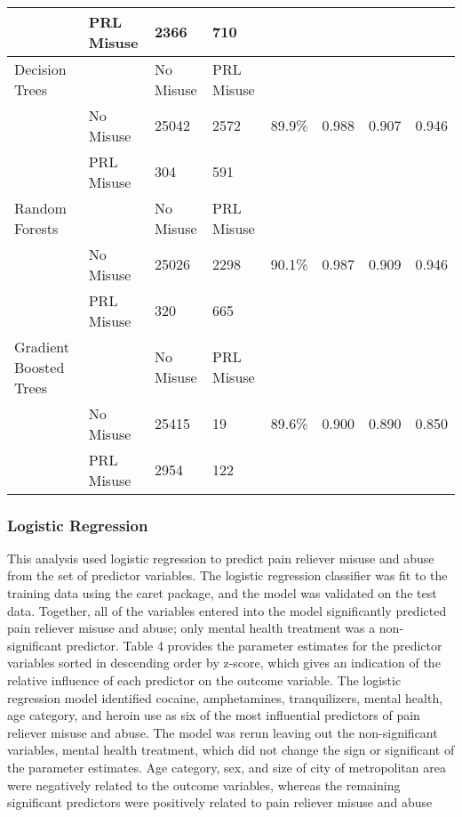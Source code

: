 \\\documentclass[sigconf]{acmart}
\begin{document}
\begin{table*}[ht]
\begin{tabular}{llllllll}
     & PRL Misuse & 2366 & 710 &  &  &  & \\
    \midrule
    Decision Trees & & No Misuse & PRL Misuse &  &  &  & \\
     & No Misuse & 25042 & 2572 & 89.9\% & 0.988 & 0.907 & 0.946 \\
     & PRL Misuse & 304 & 591 &  &  &  & \\
    \midrule
    Random Forests & & No Misuse & PRL Misuse &  &  &  & \\
     & No Misuse & 25026 & 2298 & 90.1\% & 0.987 & 0.909 & 0.946 \\
     & PRL Misuse & 320 & 665 &  &  &  & \\
    \midrule
    Gradient Boosted Trees & & No Misuse & PRL Misuse &  &  &  & \\
     & No Misuse & 25415 & 19 & 89.6\% & 0.900 & 0.890 & 0.850 \\
     & PRL Misuse & 2954 & 122 &  &  &  & \\
    \bottomrule
  \end{tabular}
\end{table*}


\subsubsection{Logistic Regression}
 
This analysis used logistic regression to predict pain reliever misuse and abuse
from the set of predictor variables. The logistic regression classifier was fit to 
the training data using the caret package, and the model was validated on the test 
data. Together, all of the variables entered into the model significantly predicted 
pain reliever misuse and abuse; only mental health treatment was a non-significant
predictor. Table 4 provides the parameter estimates for the predictor variables 
sorted in descending order by z-score, which gives an indication of the relative
influence of each predictor on the outcome variable. The logistic regression model 
identified cocaine, amphetamines, tranquilizers, mental health, age category, and 
heroin use as six of the most influential predictors of pain reliever misuse and 
abuse. The model was rerun leaving out the non-significant variables, mental health treatment, which did not change the sign or significant of the parameter estimates. 
Age category, sex, and size of city of metropolitan area were negatively related
to the outcome variables, whereas the remaining significant predictors were 
positively related to pain reliever misuse and abuse
\end{document}

